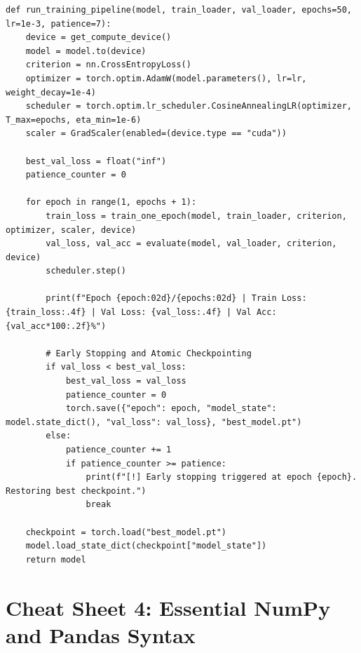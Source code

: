 \begin{lstlisting}[style=pythonstyle, caption={Production-Grade PyTorch Training Pipeline Template.}, label={lst:pytorch_template}]
def run_training_pipeline(model, train_loader, val_loader, epochs=50, lr=1e-3, patience=7):
    device = get_compute_device()
    model = model.to(device)
    criterion = nn.CrossEntropyLoss()
    optimizer = torch.optim.AdamW(model.parameters(), lr=lr, weight_decay=1e-4)
    scheduler = torch.optim.lr_scheduler.CosineAnnealingLR(optimizer, T_max=epochs, eta_min=1e-6)
    scaler = GradScaler(enabled=(device.type == "cuda"))

    best_val_loss = float("inf")
    patience_counter = 0

    for epoch in range(1, epochs + 1):
        train_loss = train_one_epoch(model, train_loader, criterion, optimizer, scaler, device)
        val_loss, val_acc = evaluate(model, val_loader, criterion, device)
        scheduler.step()

        print(f"Epoch {epoch:02d}/{epochs:02d} | Train Loss: {train_loss:.4f} | Val Loss: {val_loss:.4f} | Val Acc: {val_acc*100:.2f}%")

        # Early Stopping and Atomic Checkpointing
        if val_loss < best_val_loss:
            best_val_loss = val_loss
            patience_counter = 0
            torch.save({"epoch": epoch, "model_state": model.state_dict(), "val_loss": val_loss}, "best_model.pt")
        else:
            patience_counter += 1
            if patience_counter >= patience:
                print(f"[!] Early stopping triggered at epoch {epoch}. Restoring best checkpoint.")
                break

    checkpoint = torch.load("best_model.pt")
    model.load_state_dict(checkpoint["model_state"])
    return model
\end{lstlisting}

\section{Cheat Sheet 4: Essential NumPy and Pandas Syntax}\label{sec:cs_numpy_pandas}

